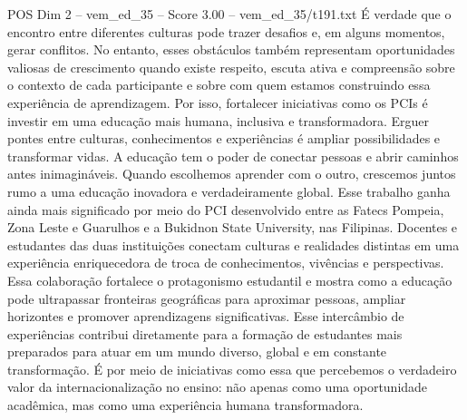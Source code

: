 \begin{textsample}{POS Dim 2 – vem\_ed\_35 – Score 3.00 – vem\_ed\_35/t191.txt}
É verdade que o encontro entre diferentes culturas pode trazer desafios e, em alguns momentos, gerar conflitos.
No entanto, esses obstáculos também representam oportunidades valiosas de crescimento quando existe respeito, escuta ativa e compreensão sobre o contexto de cada participante e sobre com quem estamos construindo essa experiência de aprendizagem.
Por isso, fortalecer iniciativas como os PCIs é investir em uma educação mais humana, inclusiva e transformadora.
Erguer pontes entre culturas, conhecimentos e experiências é ampliar possibilidades e transformar vidas.
A educação tem o poder de conectar pessoas e abrir caminhos antes inimagináveis.
Quando escolhemos aprender com o outro, crescemos juntos rumo a uma educação inovadora e verdadeiramente global.
Esse trabalho ganha ainda mais significado por meio do PCI desenvolvido entre as Fatecs Pompeia, Zona Leste e Guarulhos e a Bukidnon State University, nas Filipinas.
Docentes e estudantes das duas instituições conectam culturas e realidades distintas em uma experiência enriquecedora de troca de conhecimentos, vivências e perspectivas.
Essa colaboração fortalece o protagonismo estudantil e mostra como a educação pode ultrapassar fronteiras geográficas para aproximar pessoas, ampliar horizontes e promover aprendizagens significativas.
Esse intercâmbio de experiências contribui diretamente para a formação de estudantes mais preparados para atuar em um mundo diverso, global e em constante transformação.
É por meio de iniciativas como essa que percebemos o verdadeiro valor da internacionalização no ensino: não apenas como uma oportunidade acadêmica, mas como uma experiência humana transformadora.

\end{textsample}
